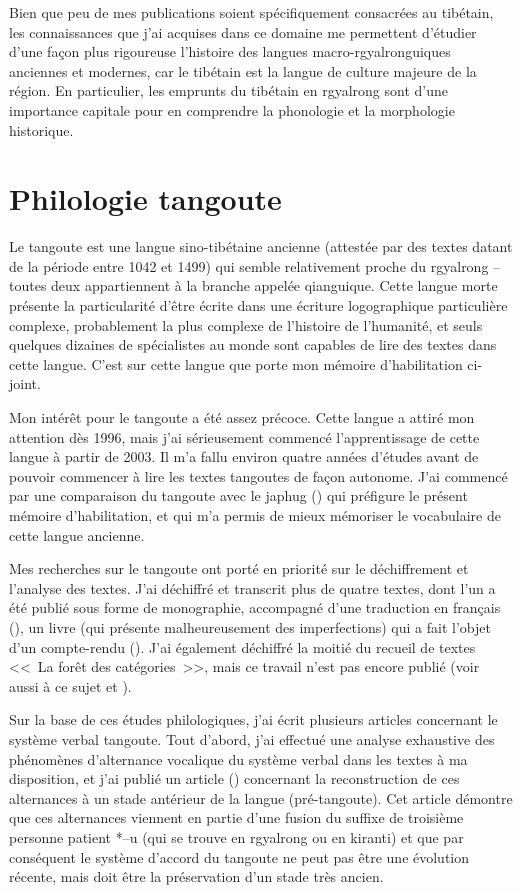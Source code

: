 \documentclass[oldfontcommands,oneside,a4paper,11pt]{memoir}
\begin{document}
Bien que peu de mes publications soient spécifiquement consacrées au tibétain, les connaissances que j’ai acquises dans ce domaine me permettent d’étudier d’une façon plus rigoureuse l’histoire des langues macro-rgyalronguiques anciennes et modernes, car le tibétain est la langue de culture majeure de la région. En particulier, les emprunts du tibétain en rgyalrong sont d'une importance capitale pour en comprendre la phonologie et la morphologie historique.

\section{Philologie tangoute}
	Le tangoute est une langue sino-tibétaine ancienne (attestée par des textes datant de la période entre 1042 et 1499) qui semble relativement proche du rgyalrong – toutes deux appartiennent à la branche appelée qianguique. Cette langue morte présente la particularité d’être écrite dans une écriture logographique particulière complexe, probablement la plus complexe de l’histoire de l’humanité, et seuls quelques dizaines de spécialistes au monde sont capables de lire des textes dans cette langue. C'est sur cette langue que porte mon mémoire d'habilitation ci-joint.
	
	Mon intérêt pour le tangoute a été assez précoce. Cette langue a attiré mon attention dès 1996, mais j'ai sérieusement commencé l'apprentissage de cette langue à partir de 2003. Il m'a fallu environ quatre années d'études avant de pouvoir commencer à lire les textes tangoutes de façon autonome. J'ai commencé par une comparaison du tangoute avec le japhug (\citealt{jacques06comparaison}) qui préfigure le présent mémoire d'habilitation, et qui m'a permis de mieux mémoriser le vocabulaire de cette langue ancienne.
	
	Mes recherches sur le tangoute ont porté en priorité sur le déchiffrement et l’analyse des textes. J’ai déchiffré et transcrit plus de quatre textes, dont l’un a été publié sous forme de monographie, accompagné d’une traduction en français (\citealt{jacques07textes}), un livre (qui présente malheureusement des imperfections) qui a fait l'objet d'un compte-rendu (\citealt{zaitsev09}). J'ai également déchiffré la moitié du recueil de textes <<~La forêt des catégories~>>, mais ce travail n'est pas encore publié (voir aussi à ce sujet \citealt{kepping83} et \citealt{leilin90}).
	

	Sur la base de ces études philologiques, j’ai écrit plusieurs articles concernant le système verbal tangoute. Tout d’abord, j’ai effectué une analyse exhaustive des phénomènes d’alternance vocalique du système verbal dans les textes à ma disposition, et j'ai publié un article (\citealt{jacques09tangutverb}) concernant la reconstruction de ces alternances à un stade antérieur de la langue (pré-tangoute). Cet article démontre que ces alternances viennent en partie d'une fusion du suffixe de troisième personne patient *--u (qui se trouve en rgyalrong ou en kiranti) et  que par conséquent  le système d'accord du tangoute ne peut pas être une évolution récente, mais doit être la préservation d'un stade très ancien.
	
\end{document}

